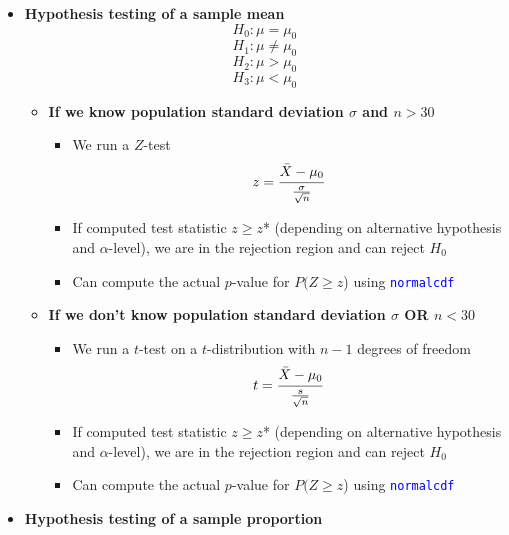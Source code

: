\documentclass{article}
\begin{document}
\begin{itemize}
\begin{itemize}
	\item \textbf{Hypothesis testing of a sample mean}
	\begin{equation*}
	H_0: \mu=\mu_0	
	\end{equation*}
	\begin{equation*}
	H_1: \mu \neq \mu_0
	\end{equation*}
	\begin{equation*}
	H_2: \mu > \mu_0
	\end{equation*}
	\begin{equation*}
	H_3: \mu <\mu_0	
	\end{equation*}
	\begin{itemize}
		\item \textbf{If we know population standard deviation $\sigma$ and $n>30$}
			\begin{itemize}
				\item We run a $Z$-test
						\begin{equation*}
						z = \cfrac{\bar{X}-\mu_0}{\frac{\sigma}{\sqrt{n}}}
						\end{equation*}
				\item If computed test statistic $z \geq z$* (depending on alternative hypothesis and $\alpha$-level), we are in the rejection region and can reject $H_0$
					\item Can compute the actual $p$-value for $P(Z \geq z$) using \textcolor{blue}{\texttt{normalcdf}}
			\end{itemize} 
				\item \textbf{If we don't know population standard deviation $\sigma$ OR $n<30$}
			\begin{itemize}
				\item We run a $t$-test on a $t$-distribution with $n-1$ degrees of freedom
						\begin{equation*}
						t = \cfrac{\bar{X}-\mu_0}{\frac{s}{\sqrt{n}}}
						\end{equation*}
				\item If computed test statistic $z \geq z$* (depending on alternative hypothesis and $\alpha$-level), we are in the rejection region and can reject $H_0$
					\item Can compute the actual $p$-value for $P(Z \geq z$) using \textcolor{blue}{\texttt{normalcdf}}
			\end{itemize} 
	\end{itemize}
	\item \textbf{Hypothesis testing of a sample proportion}
		\begin{equation*}

\end{equation*}
\end{itemize}
\end{itemize}
\end{document}
